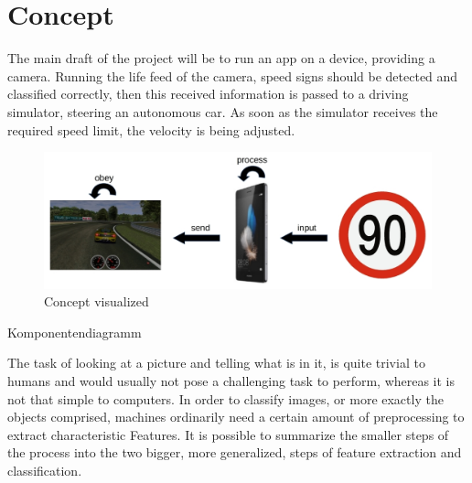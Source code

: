 \chapter{Concept}\label{chapter:Concept}
The main draft of the project will be to run an app on a device, providing a camera. Running the life feed of the camera, speed signs should be detected and classified correctly, then this received information is passed to a driving simulator, steering an autonomous car. As soon as the simulator receives the required speed limit, the velocity is being adjusted. 
\begin{figure}[H]
	\includegraphics[width=\linewidth]{images/concept.jpg}
	\caption{Concept visualized}
\end{figure}

Komponentendiagramm\newline

The task of looking at a picture and telling what is in it, is quite trivial to humans and would usually not pose a challenging task to perform, whereas it is not that simple to computers. In order to classify images, or more exactly the objects comprised, machines ordinarily need a certain amount of preprocessing to extract characteristic Features. It is possible to summarize the smaller steps of the process into the two bigger, more generalized, steps of feature extraction and classification.



